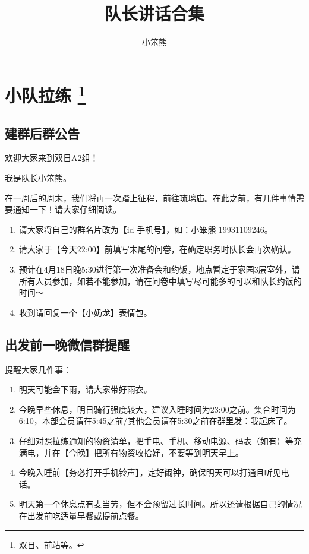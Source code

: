 \documentclass[UTF8]{ctexart}
\title{队长讲话合集}
\author{小笨熊}
\begin{document}
\maketitle

\tableofcontents
\section[小队拉练]{小队拉练 \protect\footnote{双日、前站等。} }

\subsection{建群后群公告}

欢迎大家来到双日A2组！

我是队长小笨熊。

在一周后的周末，我们将再一次踏上征程，前往琉璃庙。在此之前，有几件事情需要通知一下！请大家仔细阅读。

\begin{enumerate}[nosep,left=4em]
    \item 请大家将自己的群名片改为【id 手机号】，如：小笨熊 19931109246。
    \item 请大家于【今天22:00】前填写末尾的问卷，在确定职务时队长会再次确认。    
    \item 预计在4月18日晚5:30进行第一次准备会和约饭，地点暂定于家园3层室外，请所有人员参加，如若不能参加，请在问卷中填写尽可能多的可以和队长约饭的时间～    
    \item 收到请回复一个【小奶龙】表情包。
\end{enumerate}


\subsection{出发前一晚微信群提醒}\label{小队}

提醒大家几件事：
\begin{enumerate}[nosep,left=4em]
    \item 明天可能会下雨，请大家带好雨衣。
    \item 今晚早些休息，明日骑行强度较大，建议入睡时间为23:00之前。集合时间为6:10，本部会员请在5:45之前/其他会员请在5:30之前在群里发：我起床了。
    \item 仔细对照拉练通知的物资清单，把手电、手机、移动电源、码表（如有）等充满电，并在【今晚】把所有物资收拾好，不要等到明天早上。
    \item 今晚入睡前【务必打开手机铃声】，定好闹钟，确保明天可以打通且听见电话。
    \item 明天第一个休息点有麦当劳，但不会预留过长时间。所以还请根据自己的情况在出发前吃适量早餐或提前点餐。
\end{enumerate}
\end{document}
